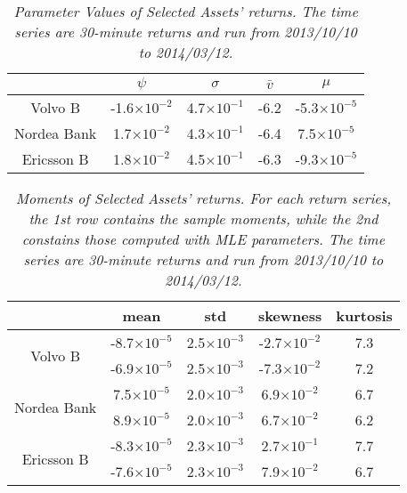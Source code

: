 \begin{table}[htb!]
  \centering
  \begin{tabular}{|c|c|c|c|c|}
    \hline
    & $\psi$ & $\sigma$ & $\bar{v}$ & $\mu$ \\
    \hline
    Volvo B & -1.6$\times 10^{-2}$ & 4.7$\times 10^{-1}$ & -6.2&
    -5.3$\times 10^{-5}$ \\
    Nordea Bank & 1.7$\times 10^{-2}$ & 4.3$\times 10^{-1}$ & -6.4 &
    7.5$\times 10^{-5}$ \\
    Ericsson B & 1.8$\times 10^{-2}$ & 4.5$\times 10^{-1}$ & -6.3 &
    -9.3$\times 10^{-5}$ \\
    \hline
  \end{tabular}
  \caption{\small \it Parameter Values of Selected Assets'
    returns. The time series are 30-minute returns and run from
    2013/10/10 to 2014/03/12.}
  \label{tab:assets_params}
\end{table}
\begin{table}[htb!]
  \centering
  \begin{tabular}{|c|c|c|c|c|}
    \hline
    & mean & std & skewness & kurtosis \\
    \hline
    \multirow{2}{*}{Volvo B} & -8.7$\times 10^{-5}$ & 2.5$\times 10^{-3}$ &
    -2.7$\times 10^{-2}$ & 7.3 \\
    & -6.9$\times 10^{-5}$ & 2.5$\times 10^{-3}$ & -7.3$\times
    10^{-2}$ & 7.2 \\
    \hline
    \multirow{2}{*}{Nordea Bank} & 7.5$\times 10^{-5}$ & 2.0$\times 10^{-3}$ &
    6.9$\times 10^{-2}$ & 6.7 \\
    & 8.9$\times 10^{-5}$ & 2.0$\times 10^{-3}$ &
    6.7$\times 10^{-2}$ & 6.2 \\
    \hline
    \multirow{2}{*}{Ericsson B} & -8.3$\times 10^{-5}$ & 2.3$\times 10^{-3}$ &
    2.7$\times 10^{-1}$ & 7.7 \\
    & -7.6$\times 10^{-5}$ & 2.3$\times 10^{-3}$ &
    7.9$\times 10^{-2}$ & 6.7 \\
    \hline
  \end{tabular}
  \caption{\small \it Moments of Selected Assets' returns. For each return
    series, the 1st row contains the sample moments, while the 2nd
    constains those computed with MLE parameters. The time series are
    30-minute returns and run from 2013/10/10 to 2014/03/12.}
  \label{tab:assets_moments}
\end{table}

